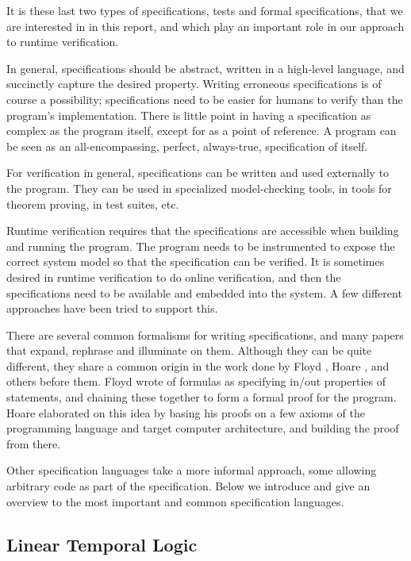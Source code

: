 It is these last two types of specifications, tests and formal specifications,
that we are interested in in this report, and which play an important role in
our approach to runtime verification.

In general, specifications should be abstract, written in a high-level
language, and succinctly capture the desired property. Writing erroneous
specifications is of course a possibility; specifications need to be easier for
humans to verify than the program's implementation. There is little point in
having a specification as complex as the program itself, except for as a point
of reference. A program can be seen as an all-encompassing, perfect,
always-true, specification of itself.

For verification in general, specifications can be written and used externally
to the program. They can be used in specialized model-checking tools, in tools
for theorem proving, in test suites, etc.

Runtime verification requires that the specifications are accessible when
building and running the program. The program needs to be instrumented to
expose the correct system model so that the specification can be verified. It
is sometimes desired in runtime verification to do online verification, and
then the specifications need to be available and embedded into the system. A
few different approaches have been tried to support this.

There are several common formalisms for writing specifications, and many papers
that expand, rephrase and illuminate on them. Although they can be quite
different, they share a common origin in the work done by Floyd \cite{floyd67},
Hoare \cite{hoare69}, and others before them. Floyd wrote of formulas as
specifying in/out properties of statements, and chaining these together to form
a formal proof for the program. Hoare elaborated on this idea by basing his
proofs on a few axioms of the programming language and target computer
architecture, and building the proof from there.

Other specification languages take a more informal approach, some allowing
arbitrary code as part of the specification. Below we introduce and give an
overview to the most important and common specification languages.


\subsection{Linear Temporal Logic} \label{section-ltl}

